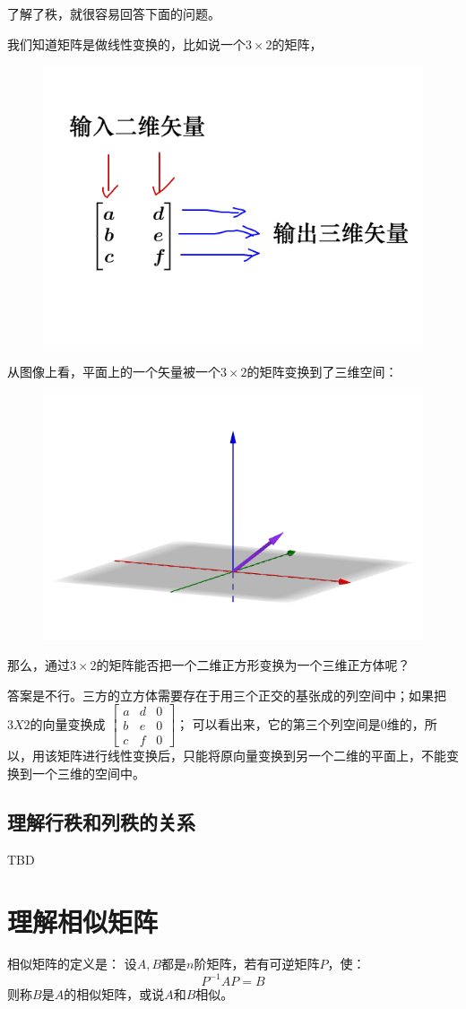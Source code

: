 \documentclass[12pt]{article}
\begin{document}
\begin{framed}  
\small{
了解了秩，就很容易回答下面的问题。

我们知道矩阵是做线性变换的，比如说一个$3\times2$的矩阵，
\begin{figure}[H]
    \centering
    \includegraphics[width=.3\textwidth]{fig/UnderstandDeterminant_5.png}
\end{figure}  

从图像上看，平面上的一个矢量被一个$3\times2$的矩阵变换到了三维空间：
\begin{figure}[H]
    \centering
    \includegraphics[width=.3\textwidth]{fig/UnderstandDeterminant_6.png}
\end{figure} 

那么，通过$3\times2$的矩阵能否把一个二维正方形变换为一个三维正方体呢？

答案是不行。三方的立方体需要存在于用三个正交的基张成的列空间中；如果把$3X2$的向量变换成 
$\begin{bmatrix}
a&d&0\\b&e&0\\c&f&0
\end{bmatrix}$；
可以看出来，它的第三个列空间是0维的，所以，用该矩阵进行线性变换后，只能将原向量变换到另一个二维的平面上，不能变换到一个三维的空间中。
}
\end{framed}

\subsection{理解行秩和列秩的关系\cite{Why_Rank_Of_Row_Column_Equal}}
TBD

\section{理解相似矩阵\cite{How_To_Understand_Similar_Matrix}}
相似矩阵的定义是：
设$A,B$都是$n$阶矩阵，若有可逆矩阵$P$，使：
$$
P^{-1}AP=B
$$
则称$B$是$A$的相似矩阵，或说$A$和$B$相似。
\end{document}
